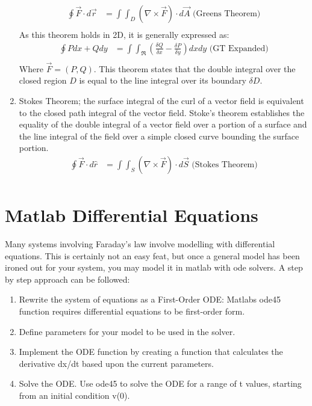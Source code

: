 \documentclass{book}
\begin{document}
\begin{enumerate}
	\begin{align*}
		\oint \vec{F} \cdot d\vec{r} &= \int \int_{D} (\nabla \times \vec{F}) \cdot d\vec{A} \text{ (Greens Theorem)}\\
	\end{align*}
	As this theorem holds in 2D, it is generally expressed as:
	\begin{align*}
		\oint Pdx + Q dy &= \int \int_{\Re} ( \frac{\delta Q}{\delta x}  - \frac{\delta P}{\delta y})dx dy \text{ (GT Expanded)} \\
	\end{align*}
	Where $\vec{F} = (P,Q)$. This theorem states that the double integral over the closed region $D$ is equal to the line integral over its boundary $\delta D$. 
	
	\item Stokes Theorem; the surface integral of the curl of a vector field is equivalent to the closed path integral of the vector field. Stoke's theorem establishes the equality of the double integral of a vector field over a portion of a surface and the line integral of the field over a simple closed curve bounding the surface portion.
	\begin{align*}
		\oint \vec{F} \cdot d\hat{r}&= \int \int_{S} (\nabla \times \vec{F} ) \cdot d\vec{S} \text{ (Stokes Theorem)}\\
	\end{align*}
\end{enumerate}

\section{Matlab Differential Equations}

Many systems involving Faraday's law involve modelling with differential equations. This is certainly not an easy feat, but once a general model has been ironed out for your system, you may model it in matlab with ode solvers. A step by step approach can be followed:

\begin{enumerate}
	\item Rewrite the system of equations as a First-Order ODE: Matlabs ode45 function requires differential equations to be first-order form. 
	\item Define parameters for your model to be used in the solver.
	\item Implement the ODE function by creating a function that calculates the derivative dx/dt based upon the current parameters.
	\item Solve the ODE. Use ode45 to solve the ODE for a range of t values, starting from an initial condition v(0).
\end{enumerate}
\end{document}
